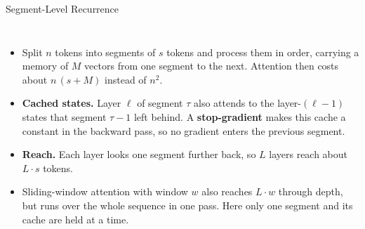\begin{frame}{Segment-Level Recurrence}
  \begin{columns}[T,onlytextwidth]
      \begin{itemize}\footnotesize\itemsep0.4em
        \item[\textcolor{red}{$\blacktriangleright$}] Split $n$ tokens into segments of $s$ tokens and process them in order, carrying a memory of $M$ vectors from one segment to the next. Attention then costs about $n\,(s+M)$ instead of $n^2$.
        \item[\textcolor{red}{$\blacktriangleright$}] \textbf{Cached states.} Layer $\ell$ of segment $\tau$ also attends to the layer-$(\ell-1)$ states that segment $\tau-1$ left behind. A \textbf{stop-gradient} makes this cache a constant in the backward pass, so no gradient enters the previous segment.
        \item[\textcolor{red}{$\blacktriangleright$}] \textbf{Reach.} Each layer looks one segment further back, so $L$ layers reach about $L\cdot s$ tokens.
        \item[\textcolor{red}{$\blacktriangleright$}] Sliding-window attention with window $w$ also reaches $L\cdot w$ through depth, but runs over the whole sequence in one pass. Here only one segment and its cache are held at a time.
      \end{itemize}
      \centering
      \vspace{0.2em}
\end{columns}
\end{frame}
